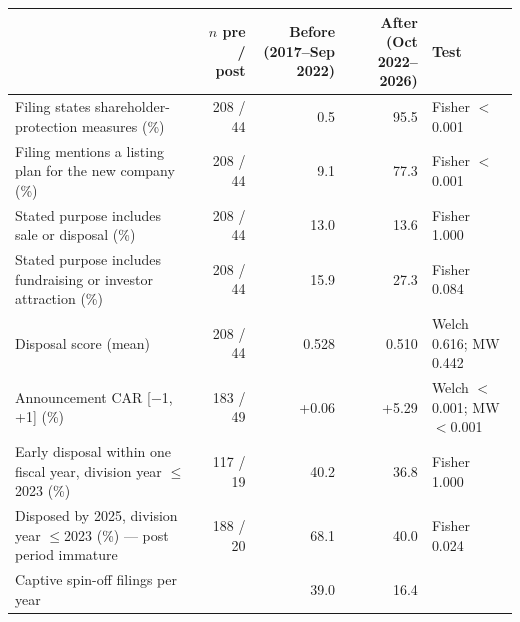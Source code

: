 \begin{tabular}{>{\raggedright\arraybackslash}p{6.0cm}rrr>{\raggedright\arraybackslash}p{2.6cm}}
\toprule
 & $n$ pre / post & Before (2017--Sep 2022) & After (Oct 2022--2026) & Test \\
\midrule
Filing states shareholder-protection measures (\%) & 208 / 44 & 0.5 & 95.5 & Fisher $<$0.001 \\
Filing mentions a listing plan for the new company (\%) & 208 / 44 & 9.1 & 77.3 & Fisher $<$0.001 \\
Stated purpose includes sale or disposal (\%) & 208 / 44 & 13.0 & 13.6 & Fisher 1.000 \\
Stated purpose includes fundraising or investor attraction (\%) & 208 / 44 & 15.9 & 27.3 & Fisher 0.084 \\
Disposal score (mean) & 208 / 44 & 0.528 & 0.510 & Welch 0.616; MW 0.442 \\
Announcement CAR [$-$1, +1] (\%) & 183 / 49 & +0.06 & +5.29 & Welch $<$0.001; MW $<$0.001 \\
Early disposal within one fiscal year, division year $\le$2023 (\%) & 117 / 19 & 40.2 & 36.8 & Fisher 1.000 \\
Disposed by 2025, division year $\le$2023 (\%) --- post period immature & 188 / 20 & 68.1 & 40.0 & Fisher 0.024 \\
Captive spin-off filings per year & & 39.0 & 16.4 & \\
\bottomrule
\end{tabular}

